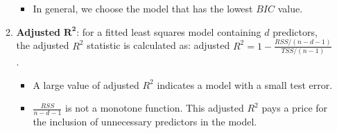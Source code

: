\documentclass[11pt]{article}
\begin{document}
\begin{itemize}
\begin{enumerate}
\begin{itemize}
                    \item In general, we choose the model that has the lowest $BIC$ value.
                \end{itemize}
            \item \textbf{Adjusted} $\boldsymbol{R^2}$: for a fitted least squares model containing $d$ predictors, the adjusted $R^2$ statistic is calculated as: adjusted $R^2 = 1 - \frac{RSS/(n-d-1)}{TSS/(n-1)}$.
                \begin{itemize}
                    \item A large value of adjusted $R^2$ indicates a model with a small test error.
                    \item $\frac{RSS}{n-d-1}$ is not a monotone function. This adjusted $R^2$ pays a price for the inclusion of unnecessary predictors in the model.
                \end{itemize}
        \end{enumerate}
\end{itemize}
\end{document}
